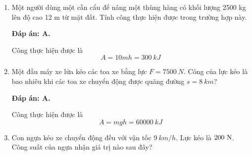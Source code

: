 \begin{enumerate}[label=\bfseries Câu \arabic*:, leftmargin=1.5cm]
	
	{
		Phát biểu nào sau đây đầy đủ nhất khi nói về sự chuyển hóa cơ năng?
		
	}
	
	\hideall
	{	
		\textbf{Đáp án: D.}
	}
	\item {}
	
	
	{
		Một người dùng một cần cẩu để nâng một thùng hàng có khối lượng 2500 kg lên độ cao 12 m từ mặt đất. Tính công thực hiện được trong trường hợp này.
		
	}
	
	\hideall
	{	
		\textbf{Đáp án: A.}
		
		Công thực hiện được là
		$$A=10mh=\SI{300}{kJ}$$
	}
	\item {}
	
	
	{
		Một đầu máy xe lửa kéo các toa xe bằng lực $F=\SI{7500}{N}$. Công của lực kéo là bao nhiêu khi các toa xe chuyển động được quãng đường $s=\SI{8}{km}$?
		
	}
	
	\hideall
	{	
		\textbf{Đáp án: A.}
		
		Công thực hiện được là
		$$A=mgh=\SI{60000}{kJ}$$
	}
	\item {}
	
	
	{
		Con ngựa kéo xe chuyển động đều với vận tốc $\SI{9}{km/h}$. Lực kéo là $200\ \text N$. Công suất của ngựa nhận giá trị nào sau đây?
		
}
\end{enumerate}
